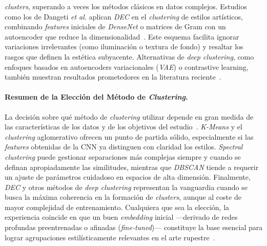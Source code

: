 \textit{clusters}, superando a veces los métodos clásicos en datos complejos. Estudios como los de Dangeti \textit{et al.} aplican \textit{DEC} en el \textit{clustering} de estilos artísticos, combinando \textit{features} iniciales de \textit{DenseNet} o matrices de Gram con un autoencoder que reduce la dimensionalidad~\cite{dangeti2024}. Este esquema facilita ignorar variaciones irrelevantes (como iluminación o textura de fondo) y resaltar los rasgos que definen la estética subyacente. Alternativas de \textit{deep clustering}, como enfoques basados en autoencoders variacionales (\textit{VAE}) o contrastive learning, también muestran resultados prometedores en la literatura reciente~\cite{parisotto2022}. \paragraph{Resumen de la Elección del Método de \textit{Clustering}.} La decisión sobre qué método de \textit{clustering} utilizar depende en gran medida de las características de los datos y de los objetivos del estudio~\cite{dangeti2024}. \textit{K-Means} y el \textit{clustering} aglomerativo ofrecen un punto de partida sólido, especialmente si las \textit{features} obtenidas de la CNN ya distinguen con claridad los estilos. \textit{Spectral clustering} puede gestionar separaciones más complejas siempre y cuando se definan apropiadamente las similitudes, mientras que \textit{DBSCAN} tiende a requerir un ajuste de parámetros cuidadoso en espacios de alta dimensión. Finalmente, \textit{DEC} y otros métodos de \textit{deep clustering} representan la vanguardia cuando se busca la máxima coherencia en la formación de \textit{clusters}, aunque al coste de mayor complejidad de entrenamiento. Cualquiera que sea la elección, la experiencia coincide en que un buen \textit{embedding} inicial —derivado de redes profundas preentrenadas o afinadas (\textit{fine-tuned})— constituye la base esencial para lograr agrupaciones estilísticamente relevantes en el arte rupestre~\cite{guerin2018,gultepe2018,dangeti2024}.

